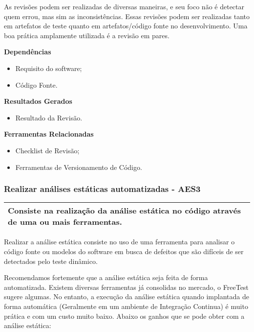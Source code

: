 As revisões podem ser realizadas de diversas maneiras, e seu foco não é detectar quem errou, mas sim as inconsistências. Essas revisões podem ser realizadas tanto em artefatos de teste quanto em artefatos/código fonte no desenvolvimento. Uma boa prática amplamente utilizada é a revisão em pares.

\textbf{ Dependências }
\begin{itemize}
    \item Requisito do software;
    \item Código Fonte.
\end{itemize}

\textbf{ Resultados Gerados }
\begin{itemize}
    \item Resultado da Revisão.
\end{itemize}

\textbf{ Ferramentas Relacionadas }
\begin{itemize}
    \item Checklist de Revisão;
    \item Ferramentas de Versionamento de Código.
\end{itemize}

\subsubsection{Realizar análises estáticas automatizadas - AES3}
\label{sec:aes3}

\begin{table}[H]
\centering
\begin{tabular}{|p{130mm}|}
\hline
Consiste na realização da análise estática no código através de uma ou mais ferramentas. \\
\hline
\end{tabular}
\end{table}

Realizar a análise estática consiste no uso de uma ferramenta para analisar o código fonte ou modelos do software em busca de defeitos que são difíceis de ser detectados pelo teste dinâmico.

Recomendamos fortemente que a análise estática seja feita de forma automatizada. Existem diversas ferramentas já consolidas no mercado, o FreeTest sugere algumas. No entanto, a execução da análise estática quando implantada de forma automática (Geralmente em um ambiente de Integração Continua) é muito prática e com um custo muito baixo. Abaixo os ganhos que se pode obter com a análise estática:

